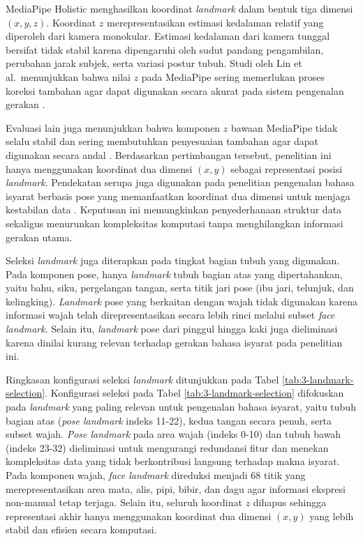 MediaPipe Holistic menghasilkan koordinat \textit{landmark} dalam bentuk tiga dimensi $(x, y, z)$.
Koordinat $z$ merepresentasikan estimasi kedalaman relatif yang diperoleh dari kamera monokular.
Estimasi kedalaman dari kamera tunggal bersifat tidak stabil karena dipengaruhi oleh sudut pandang pengambilan, perubahan jarak subjek, serta variasi postur tubuh.
Studi oleh Lin et al.\ menunjukkan bahwa nilai $z$ pada MediaPipe sering memerlukan proses koreksi tambahan agar dapat digunakan secara akurat pada sistem pengenalan gerakan \cite{lin2023detection}.

Evaluasi lain juga menunjukkan bahwa komponen $z$ bawaan MediaPipe tidak selalu stabil dan sering membutuhkan penyesuaian tambahan agar dapat digunakan secara andal \cite{accuracy3dmediapipe,lin2023detection}.
Berdasarkan pertimbangan tersebut, penelitian ini hanya menggunakan koordinat dua dimensi $(x, y)$ sebagai representasi posisi \textit{landmark}.
Pendekatan serupa juga digunakan pada penelitian pengenalan bahasa isyarat berbasis pose yang memanfaatkan koordinat dua dimensi untuk menjaga kestabilan data \cite{purbojo2025normalization}.
Keputusan ini memungkinkan penyederhanaan struktur data sekaligus menurunkan kompleksitas komputasi tanpa menghilangkan informasi gerakan utama.

Seleksi \textit{landmark} juga diterapkan pada tingkat bagian tubuh yang digunakan.
Pada komponen pose, hanya \textit{landmark} tubuh bagian atas yang dipertahankan, yaitu bahu, siku, pergelangan tangan, serta titik jari pose (ibu jari, telunjuk, dan kelingking).
\textit{Landmark} pose yang berkaitan dengan wajah tidak digunakan karena informasi wajah telah direpresentasikan secara lebih rinci melalui subset \textit{face landmark}.
Selain itu, \textit{landmark} pose dari pinggul hingga kaki juga dieliminasi karena dinilai kurang relevan terhadap gerakan bahasa isyarat pada penelitian ini.

Ringkasan konfigurasi seleksi \textit{landmark} ditunjukkan pada Tabel \ref{tab:3-landmark-selection}.
Konfigurasi seleksi pada Tabel \ref{tab:3-landmark-selection} difokuskan pada \textit{landmark} yang paling relevan untuk pengenalan bahasa isyarat, yaitu tubuh bagian atas (\textit{pose landmark} indeks 11-22), kedua tangan secara penuh, serta subset wajah. 
\textit{Pose landmark} pada area wajah (indeks 0-10) dan tubuh bawah (indeks 23-32) dieliminasi untuk mengurangi redundansi fitur dan menekan kompleksitas data yang tidak berkontribusi langsung terhadap makna isyarat. 
Pada komponen wajah, \textit{face landmark} direduksi menjadi 68 titik yang merepresentasikan area mata, alis, pipi, bibir, dan dagu agar informasi ekspresi non-manual tetap terjaga. 
Selain itu, seluruh koordinat $z$ dihapus sehingga representasi akhir hanya menggunakan koordinat dua dimensi $(x,y)$ yang lebih stabil dan efisien secara komputasi.


